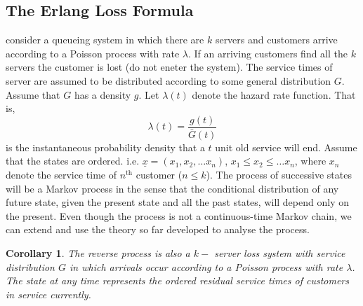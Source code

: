 \documentclass[a4paper,10pt]{article}
\theoremstyle{plain}
\newtheorem{cor}[thm]{Corollary}
\theoremstyle{definition}
\theoremstyle{remark}
\begin{document}
\subsection{The Erlang Loss Formula}
consider a queueing system in which there are $k$ servers and customers arrive according to a Poisson process with rate $\lambda$. If an arriving customers find all the $k$ servers the customer is lost (do not eneter the system). The service times of server are assumed to be distributed according to some general distribution $G$. Assume that $G$ has a density $g$. Let $\lambda(t)$ denote the hazard rate function. That is,
\begin{equation*}
\lambda(t)=\frac{g(t)}{\bar{G}(t)}
\end{equation*}
is the instantaneous probability density that a $t$ unit old service will end. Assume that the states are ordered. i.e. $\underline{x}=(x_1,x_2, \hdots x_n)$, $x_1 \leq x_2 \leq \hdots x_n$, where $x_n$ denote the service time of $n^{\text{th}}$ customer ($n \leq k$). The process of successive states will be a Markov process in the sense that the conditional distribution of any future state, given the present state and all the past states, will depend only on the present. Even though the process is not a continuous-time Markov chain, we can extend and use the theory so far developed to analyse the process.
\begin{cor}
The reverse process is also a $k-$ server loss system with service distribution $G$ in which arrivals occur according to a Poisson process with rate $\lambda$. The state at any time represents the ordered residual service times of customers in service currently.
\end{cor}  
\end{document}
